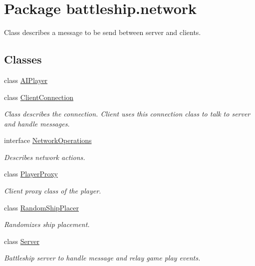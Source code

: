 \hypertarget{namespacebattleship_1_1network}{}\section{Package battleship.\+network}
\label{namespacebattleship_1_1network}


Class describes a message to be send between server and clients.  


\subsection*{Classes}
\begin{DoxyCompactItemize}
\item 
class \hyperlink{classbattleship_1_1network_1_1AIPlayer}{A\+I\+Player}
\item 
class \hyperlink{classbattleship_1_1network_1_1ClientConnection}{Client\+Connection}
\begin{DoxyCompactList}\small\item\em Class describes the connection. Client uses this connection class to talk to server and handle messages. \end{DoxyCompactList}\item 
interface \hyperlink{interfacebattleship_1_1network_1_1NetworkOperations}{Network\+Operations}
\begin{DoxyCompactList}\small\item\em Describes network actions. \end{DoxyCompactList}\item 
class \hyperlink{classbattleship_1_1network_1_1PlayerProxy}{Player\+Proxy}
\begin{DoxyCompactList}\small\item\em Client proxy class of the player. \end{DoxyCompactList}\item 
class \hyperlink{classbattleship_1_1network_1_1RandomShipPlacer}{Random\+Ship\+Placer}
\begin{DoxyCompactList}\small\item\em Randomizes ship placement. \end{DoxyCompactList}\item 
class \hyperlink{classbattleship_1_1network_1_1Server}{Server}
\begin{DoxyCompactList}\small\item\em Battleship server to handle message and relay game play events. \end{DoxyCompactList}\end{DoxyCompactItemize}


